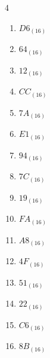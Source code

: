 \begin{multicols}{4}
\begin{enumerate}
  \item $D6_{(16)}$

        \phantom{$=214$}

  \item $64_{(16)}$

        \phantom{$=100$}

  \item $12_{(16)}$

        \phantom{$=18$}

  \item $CC_{(16)}$

        \phantom{$=204$}

  \item $7A_{(16)}$

        \phantom{$=122$}

  \item $E1_{(16)}$

        \phantom{$=225$}

  \item $94_{(16)}$

        \phantom{$=148$}

  \item $7C_{(16)}$

        \phantom{$=124$}

  \item $19_{(16)}$

        \phantom{$=25$}

  \item $FA_{(16)}$

        \phantom{$=250$}

  \item $A8_{(16)}$

        \phantom{$=168$}

  \item $4F_{(16)}$

        \phantom{$=79$}

  \item $51_{(16)}$

        \phantom{$=81$}

\columnbreak %

  \item $22_{(16)}$

        \phantom{$=34$}

  \item $C6_{(16)}$

        \phantom{$=198$}

  \item $8B_{(16)}$


\end{enumerate}
\end{multicols}
